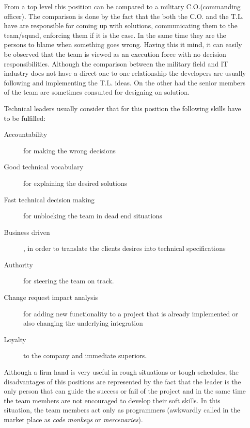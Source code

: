From a top level this position can be compared to a military C.O.(commanding officer). The comparison is done by the fact that the both the C.O. and the T.L. have are responsible for coming up with solutions, communicating them to the team/squad, enforcing them if it is the case. In the same time they are the persons to blame when something goes wrong. Having this it mind, it can easily be observed that the team is viewed as an execution force with no decision responsibilities.  Although the comparison between the military field and IT industry does not have a direct one-to-one relationship the developers are usually following and implementing the T.L. ideas. On the other had the senior members of the team are sometimes consulted for designing on solution.

Technical leaders usually consider that for this position the following skills have to be fulfilled:
\begin{description}
\item [Accountability] for making the wrong decisions
\item [Good technical vocabulary] for explaining the desired solutions
\item [Fast technical decision making] for unblocking the team in dead end situations
\item [Business driven], in order to translate the clients desires into technical specifications
\item [Authority] for steering the team on track.
\item [Change request impact analysis] for adding new functionality  to a project that is already implemented or also changing the underlying integration
\item [Loyalty] to the company and immediate superiors.
\end{description}

Although a firm hand is very useful in rough situations or tough schedules, the disadvantages of this positions are represented by the fact that the leader is the only person that can guide the success or fail of the project and in the same time the team members are not encouraged to develop their soft skills. In this situation, the team members act only as programmers (awkwardly called in the market place as \textit{code monkeys} or \textit{mercenaries}).

